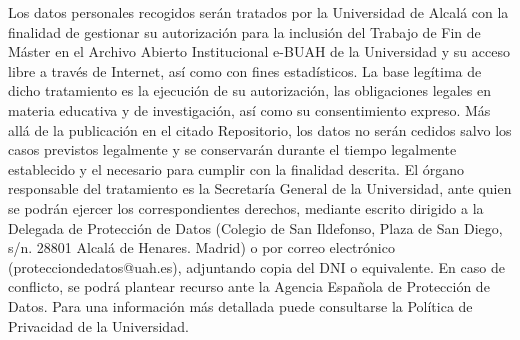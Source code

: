 \documentclass[11pt,a4paper,oneside]{article}
\begin{document}
\begin{spacing}{0.8}

{\scriptsize Los datos personales recogidos serán tratados por la Universidad de
Alcalá con la finalidad de gestionar su autorización para la inclusión
del Trabajo de Fin de Máster en el Archivo Abierto Institucional
e-BUAH de la Universidad y su acceso libre a través de Internet, así
como con fines estadísticos. La base legítima de dicho tratamiento es
la ejecución de su autorización, las obligaciones legales en materia
educativa y de investigación, así como su consentimiento expreso. Más
allá de la publicación en el citado Repositorio, los datos no serán
cedidos salvo los casos previstos legalmente y se conservarán durante
el tiempo legalmente establecido y el necesario para cumplir con la
finalidad descrita. El órgano responsable del tratamiento es la
Secretaría General de la Universidad, ante quien se podrán ejercer los
correspondientes derechos, mediante escrito dirigido a la Delegada de
Protección de Datos (Colegio de San Ildefonso, Plaza de San Diego,
s/n. 28801 Alcalá de Henares. Madrid) o por correo electrónico
(protecciondedatos@uah.es), adjuntando copia del DNI o equivalente. En
caso de conflicto, se podrá plantear recurso ante la Agencia Española
de Protección de Datos. Para una información más detallada puede
consultarse la Política de Privacidad de la Universidad.}

\end{spacing}




% 
\end{document}
